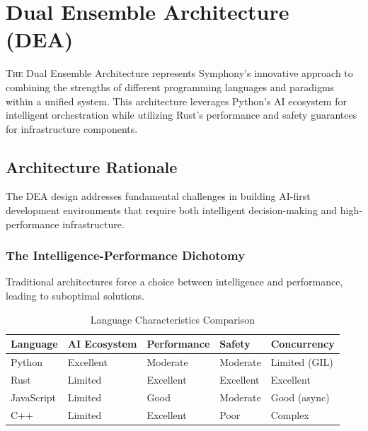
\section*{Dual Ensemble Architecture (DEA)}

\lettrine{T}{he} Dual Ensemble Architecture represents Symphony's innovative approach to combining the strengths of different programming languages and paradigms within a unified system. This architecture leverages Python's AI ecosystem for intelligent orchestration while utilizing Rust's performance and safety guarantees for infrastructure components.

\subsection*{Architecture Rationale}

The DEA design addresses fundamental challenges in building AI-first development environments that require both intelligent decision-making and high-performance infrastructure.

\subsubsection*{The Intelligence-Performance Dichotomy}

Traditional architectures force a choice between intelligence and performance, leading to suboptimal solutions.

\begin{table}[h]
\centering
\caption{Language Characteristics Comparison}
\label{tab:language-comparison}
\begin{tabular}{@{}lllll@{}}
\toprule
\textbf{Language} & \textbf{AI Ecosystem} & \textbf{Performance} & \textbf{Safety} & \textbf{Concurrency} \\
\midrule
Python & Excellent & Moderate & Moderate & Limited (GIL) \\
Rust & Limited & Excellent & Excellent & Excellent \\
JavaScript & Limited & Good & Moderate & Good (async) \\
C++ & Limited & Excellent & Poor & Complex \\
\bottomrule
\end{tabular}
\end{table}

